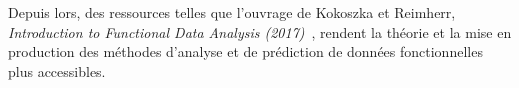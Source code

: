 \bigskip

Depuis lors, des ressources telles que l'ouvrage de Kokoszka et Reimherr, \emph{\textcolor{flatuicolors_blue_devil}{Introduction to Functional Data Analysis (2017)}}~\cite{kokoszka2017introduction}, rendent la théorie et la mise en production des méthodes d'analyse et de prédiction de données fonctionnelles plus accessibles.
